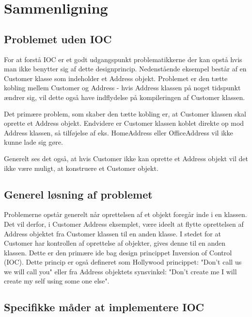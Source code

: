 \thispagestyle{fancy}
\chapter{Sammenligning}
\label{chp:comparison}

\section{Problemet uden IOC}

For at forstå IOC er et godt udgangspunkt problematikkerne der kan opstå hvis man ikke benytter sig af dette designprincip. Nedenstående eksempel består af en Customer klasse som indeholder et Address objekt. Problemet er den tætte kobling mellem Customer og Address - hvis Address klassen på noget tidspunkt ændrer sig, vil dette også have indflydelse på kompileringen af Customer klassen.


Det primære problem, som skaber den tætte kobling er, at Customer klassen skal oprette et Address objekt.
Endvidere er Customer klassen koblet direkte op mod Address klassen, så tilføjelse af eks. HomeAddress eller OfficeAddress vil ikke kunne lade sig gøre.

Generelt ses det også, at hvis Customer ikke kan oprette et Address objekt vil det ikke være muligt, at konstruere et Customer objekt.


\section{Generel løsning af problemet}

Problemerne opstår generelt når oprettelsen af et objekt foregår inde i en klassen. Det vil derfor, i Customer Address eksemplet, være ideelt at flytte oprettelsen af Address objektet fra Customer klassen til en anden klasse. I stedet for at Customer har kontrollen af oprettelse af objekter, gives denne til en anden klassen. Dette er den primære ide bag design princippet Inversion of Control (IOC).
Dette princip er også defineret som Hollywood princippet: "Don't call us we will call you" eller fra Address objektets synsvinkel: "Don't create me I will create my self using some one else".


\section{Specifikke måder at implementere IOC}

